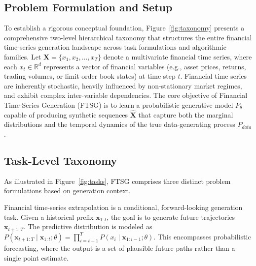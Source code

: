 \subsection{Problem Formulation and Setup}
\label{sec:taxonomy}



To establish a rigorous conceptual foundation, Figure~\ref{fig:taxonomy} presents a comprehensive two-level hierarchical taxonomy that structures the entire financial time-series generation landscape across task formulations and algorithmic families.
Let $\mathbf{X} = \{x_1, x_2, \dots, x_T\}$ denote a multivariate financial time series, where each $x_t \in \mathbb{R}^d$ represents a vector of financial variables (e.g., asset prices, returns, trading volumes, or limit order book states) at time step $t$. Financial time series are inherently stochastic, heavily influenced by non-stationary market regimes, and exhibit complex inter-variable dependencies.
The core objective of Financial Time-Series Generation (FTSG) is to learn a probabilistic generative model $P_\theta$ capable of producing synthetic sequences $\hat{\mathbf{X}}$ that capture both the marginal distributions and the temporal dynamics of the true data-generating process $P_{data}$.

\subsection{Task-Level Taxonomy}
As illustrated in Figure~\ref{fig:tasks}, FTSG comprises three distinct problem formulations based on generation context.

Financial time-series extrapolation is a conditional, forward-looking generation task. Given a historical prefix $\mathbf{x}_{1:t}$, the goal is to generate future trajectories $\mathbf{x}_{t+1:T}$. The predictive distribution is modeled as $P(\mathbf{x}_{t+1:T} \mid \mathbf{x}_{1:t}; \theta) = \prod_{i=t+1}^{T} P(x_i \mid \mathbf{x}_{1:i-1}; \theta)$. This encompasses probabilistic forecasting, where the output is a set of plausible future paths rather than a single point estimate.


